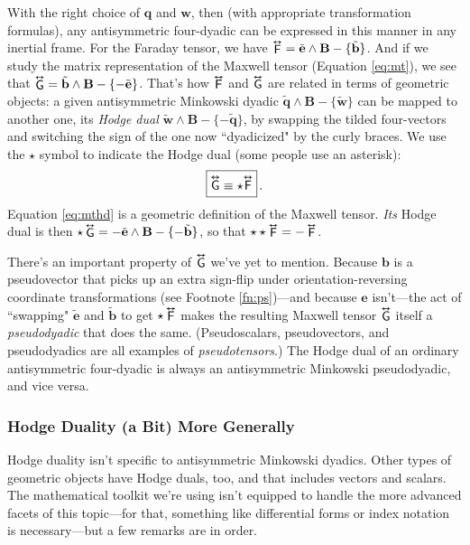 \documentclass[12pt]{article}
\renewcommand{\vv}[1]{\mathbf{#1}}
\newcommand{\tightoverset}[2]{%
  \mathop{#2}\limits^{\vbox to -.5ex{\kern-0.75ex\hbox{$#1$}\vss}}}
\newcommand{\inlinedy}[1]{\tightoverset{\text{\tiny$\bm\leftrightarrow$}}{#1}}
\newcommand{\capdy}[1]{ \overset{ \text{\tiny$\bm\leftrightarrow$} }{\vphantom{\text{\small{A}}}\smash{#1}} }
\begin{document}
With the right choice of $\vv q$ and $\vv w$, then (with appropriate transformation formulas), any antisymmetric four-dyadic can be expressed in this manner in any inertial frame. For the Faraday tensor, we have $\inlinedy{\mathsf{F}} = \tilde{\vv e} \wedge \vv B - \{ \tilde{\vv b} \}$. And if we study the matrix representation of the Maxwell tensor (Equation \ref{eq:mt}), we see that ${\inlinedy{\mathsf{G}} = \tilde{\vv b} \wedge \vv B - \{ - \tilde{\vv e} \}}$. That's how $\inlinedy{\mathsf{F}}$ and $\inlinedy{\mathsf{G}}$ are related in terms of geometric objects: a given antisymmetric Minkowski dyadic ${\tilde{\vv q} \wedge \vv B - \{ \tilde{\vv w} \}}$ can be mapped to another one, its \emph{Hodge dual} ${\tilde{\vv w} \wedge \vv B - \{ - \tilde{\vv q} \}}$, by swapping the tilded four-vectors and switching the sign of the one now ``dyadicized" by the curly braces. We use the $\star$ symbol to indicate the Hodge dual (some people use an asterisk):
\begin{equation}\label{eq:mthd}
\boxed{ \vphantom{A_{A_A}} \capdy{\mathsf{G}} \equiv \star \capdy{\mathsf{F}} } \, .
\end{equation}
Equation \ref{eq:mthd} is a geometric definition of the Maxwell tensor. \emph{Its} Hodge dual is then $\star \inlinedy{\mathsf{G}} = - \tilde{\vv e} \wedge \vv B - \{ - \tilde{\vv b} \}$, so that $\star \star \inlinedy{\mathsf{F}} = - \inlinedy{\mathsf{F}}$.

There's an important property of $\inlinedy{\mathsf{G}}$ we've yet to mention. Because $\vv b$ is a pseudovector that picks up an extra sign-flip under orientation-reversing coordinate transformations (see Footnote \ref{fn:ps})---and because $\vv e$ isn't---the act of ``swapping" $\tilde{\vv e}$ and $\tilde{\vv b}$ to get $\star \inlinedy{\mathsf{F}}$ makes the resulting Maxwell tensor $\inlinedy{\mathsf{G}}$ itself a \emph{pseudodyadic} that does the same. (Pseudoscalars, pseudovectors, and pseudodyadics are all examples of \emph{pseudotensors}.) The Hodge dual of an ordinary antisymmetric four-dyadic is always an antisymmetric Minkowski pseudodyadic, and vice versa.

\subsubsection{Hodge Duality (a Bit) More Generally}

Hodge duality isn't specific to antisymmetric Minkowski dyadics. Other types of geometric objects have Hodge duals, too, and that includes vectors and scalars. The mathematical toolkit we're using isn't equipped to handle the more advanced facets of this topic---for that, something like differential forms or index notation is necessary---but a few remarks are in order.
\end{document}
